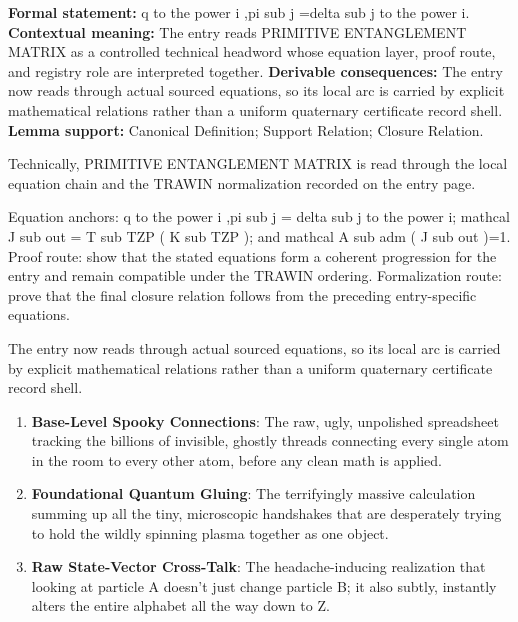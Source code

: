 \begingroup\footnotesize\setlength{\emergencystretch}{3em}\sloppy
\textbf{Formal statement:} q to the power i ,pi sub j =delta sub j to the power i. \textbf{Contextual meaning:} The entry reads PRIMITIVE ENTANGLEMENT MATRIX as a controlled technical headword whose equation layer, proof route, and registry role are interpreted together. \textbf{Derivable consequences:} The entry now reads through actual sourced equations, so its local arc is carried by explicit mathematical relations rather than a uniform quaternary certificate record shell. \textbf{Lemma support:} Canonical Definition; Support Relation; Closure Relation.\par
\endgroup

Technically, PRIMITIVE ENTANGLEMENT MATRIX is read through the local equation chain and the TRAWIN normalization recorded on the entry page.

Equation anchors: q to the power i ,pi sub j = delta sub j to the power i; mathcal J sub out = T sub TZP ( K sub TZP ); and mathcal A sub adm ( J sub out )=1. Proof route: show that the stated equations form a coherent progression for the entry and remain compatible under the TRAWIN ordering. Formalization route: prove that the final closure relation follows from the preceding entry-specific equations.

The entry now reads through actual sourced equations, so its local arc is carried by explicit mathematical relations rather than a uniform quaternary certificate record shell.
\endgroup

\begin{enumerate}[leftmargin=1.6em,itemsep=6pt,topsep=4pt]
\item \textbf{Base-Level Spooky Connections}: The raw, ugly, unpolished spreadsheet tracking the billions of invisible, ghostly threads connecting every single atom in the room to every other atom, before any clean math is applied.
\item \textbf{Foundational Quantum Gluing}: The terrifyingly massive calculation summing up all the tiny, microscopic handshakes that are desperately trying to hold the wildly spinning plasma together as one object.
\item \textbf{Raw State-Vector Cross-Talk}: The headache-inducing realization that looking at particle A doesn't just change particle B; it also subtly, instantly alters the entire alphabet all the way down to Z.
\end{enumerate}

